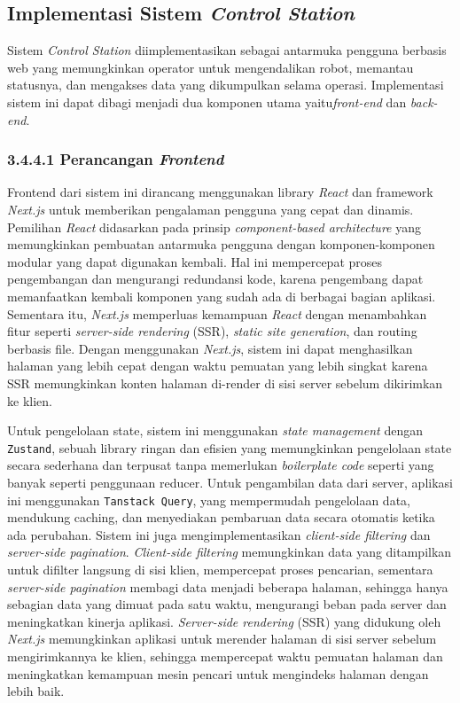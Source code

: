 \subsection{Implementasi Sistem \emph{Control Station}}
Sistem \emph{Control Station} diimplementasikan sebagai antarmuka pengguna berbasis web yang memungkinkan operator untuk mengendalikan robot, memantau statusnya, dan mengakses data yang dikumpulkan selama operasi. Implementasi sistem ini dapat dibagi menjadi dua komponen utama yaitu\emph{front-end} dan \emph{back-end}.

\subsubsection{3.4.4.1 Perancangan \emph{Frontend}}
Frontend dari sistem ini dirancang menggunakan library \textit{React} dan framework \textit{Next.js} untuk memberikan pengalaman pengguna yang cepat dan dinamis. Pemilihan \textit{React} didasarkan pada prinsip \textit{component-based architecture} yang memungkinkan pembuatan antarmuka pengguna dengan komponen-komponen modular yang dapat digunakan kembali. Hal ini mempercepat proses pengembangan dan mengurangi redundansi kode, karena pengembang dapat memanfaatkan kembali komponen yang sudah ada di berbagai bagian aplikasi. Sementara itu, \textit{Next.js} memperluas kemampuan \textit{React} dengan menambahkan fitur seperti \textit{server-side rendering} (SSR), \textit{static site generation}, dan routing berbasis file. Dengan menggunakan \textit{Next.js}, sistem ini dapat menghasilkan halaman yang lebih cepat dengan waktu pemuatan yang lebih singkat karena SSR memungkinkan konten halaman di-render di sisi server sebelum dikirimkan ke klien.

Untuk pengelolaan state, sistem ini menggunakan \textit{state management} dengan \texttt{Zustand}, sebuah library ringan dan efisien yang memungkinkan pengelolaan state secara sederhana dan terpusat tanpa memerlukan \textit{boilerplate code} seperti yang banyak seperti penggunaan reducer. Untuk pengambilan data dari server, aplikasi ini menggunakan \texttt{Tanstack Query}, yang mempermudah pengelolaan data, mendukung caching, dan menyediakan pembaruan data secara otomatis ketika ada perubahan. Sistem ini juga mengimplementasikan \textit{client-side filtering} dan \textit{server-side pagination}. \textit{Client-side filtering} memungkinkan data yang ditampilkan untuk difilter langsung di sisi klien, mempercepat proses pencarian, sementara \textit{server-side pagination} membagi data menjadi beberapa halaman, sehingga hanya sebagian data yang dimuat pada satu waktu, mengurangi beban pada server dan meningkatkan kinerja aplikasi. \textit{Server-side rendering} (SSR) yang didukung oleh \textit{Next.js} memungkinkan aplikasi untuk merender halaman di sisi server sebelum mengirimkannya ke klien, sehingga mempercepat waktu pemuatan halaman dan meningkatkan kemampuan mesin pencari untuk mengindeks halaman dengan lebih baik.

